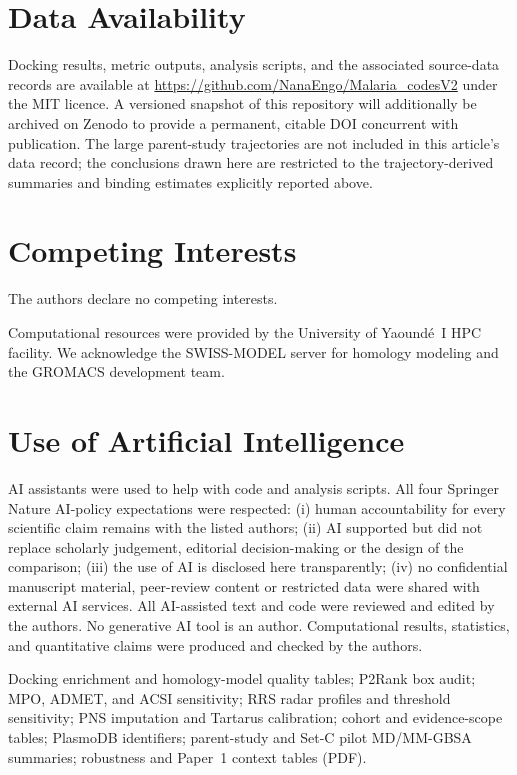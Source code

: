 \documentclass[journal=jcisd8,manuscript=article,layout=traditional]{achemso}
\begin{document}
\section*{Data Availability}

Docking results, metric outputs, analysis scripts, and the associated source-data records are available at \url{https://github.com/NanaEngo/Malaria_codesV2} under the MIT licence. A versioned snapshot of this repository will additionally be archived on Zenodo to provide a permanent, citable DOI concurrent with publication. The large parent-study trajectories are not included in this article's data record; the conclusions drawn here are restricted to the trajectory-derived summaries and binding estimates explicitly reported above.

\section*{Competing Interests}

The authors declare no competing interests.

\begin{acknowledgement}
Computational resources were provided by the University of Yaound\'{e}~I HPC facility. We acknowledge the SWISS-MODEL server for homology modeling and the GROMACS development team.
\end{acknowledgement}

\section*{Use of Artificial Intelligence}

AI assistants were used to help with code and analysis scripts. All four Springer Nature AI-policy expectations were respected: (i) human accountability for every scientific claim remains with the listed authors; (ii) AI supported but did not replace scholarly judgement, editorial decision-making or the design of the comparison; (iii) the use of AI is disclosed here transparently; (iv) no confidential manuscript material, peer-review content or restricted data were shared with external AI services. All AI-assisted text and code were reviewed and edited by the authors. No generative AI tool is an author. Computational results, statistics, and quantitative claims were produced and checked by the authors.

\begin{suppinfo}
Docking enrichment and homology-model quality tables; P2Rank box audit; MPO, ADMET, and ACSI sensitivity; RRS radar profiles and threshold sensitivity; PNS imputation and Tartarus calibration; cohort and evidence-scope tables; PlasmoDB identifiers; parent-study and Set-C pilot MD/MM-GBSA summaries; robustness and Paper~1 context tables (PDF).
\end{suppinfo}



\end{document}
